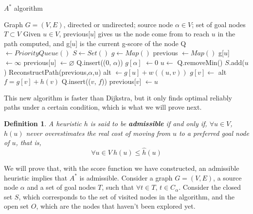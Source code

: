 \documentclass[12pt]{report}
\newtheorem{definition}[theorem]{Definition}
\begin{document}
\begin{algorithm}
\caption{$A^*$ algorithm}
\label{alg:astar}
\begin{algorithmic}[1]
\Require Graph $G = (V, E)$, directed or undirected; source node $\alpha \in V$; set of goal nodes $T \subset V$
\Ensure Given $u \in V$, previous[$u$] gives us the node come from to reach $u$ in the path computed, and g[$u$] is the current g-score of the node
\State Q $\gets PriorityQueue()$
\State $S \gets Set()$
\State $g \gets Map()$
\State previous $\gets Map()$
	\State g[$u$] $\gets \infty$
	\State previous[$u$] $\gets \varnothing$
\EndFor
\State Q.insert((0, $\alpha$))
\State $g[\alpha]$ $\gets 0$
	\State $u \gets$ Q.removeMin()
	\State $S$.add($u$)
	 
		\State \Return ReconstructPath(previous,$\alpha$,$u$)
	\EndIf
			\Continue {}
		\EndIf
		\State alt $\gets g[u] + w((u, v))$
			\State $g[v] \gets$ alt 
			\State $f = g[v] + h(v)$
			\State Q.insert(($v$, $f$))
			\State previous[$v$] $\gets u$
		\EndIf
	\EndFor
\EndWhile
\EndProcedure
\end{algorithmic}
\end{algorithm}

This new algorithm is faster than Dijkstra, but it only finds optimal reliably paths under a certain condition, which is what we will prove next.

\begin{definition}
A heuristic $h$ is said to be \textbf{admissible} if and only if, $\forall u \in V$, $h(u)$ never overestimates the real cost of moving from $u$ to a preferred goal node of $u$, that is, 
\[ \forall u \in V \ h(u) \le \hat{h}(u) \]
\end{definition}

We will prove that, with the score function we have constructed, an admissible heuristic implies that $A^*$ is admissible. Consider a graph $G = (V, E)$, a source node $\alpha$ and a set of goal nodes $T$, such that $\forall t \in T$, $t \in C_\alpha$. Consider the closed set $S$, which corresponds to the set of visited nodes in the algorithm, and the open set $O$, which are the nodes that haven't been explored yet.
\end{document}
